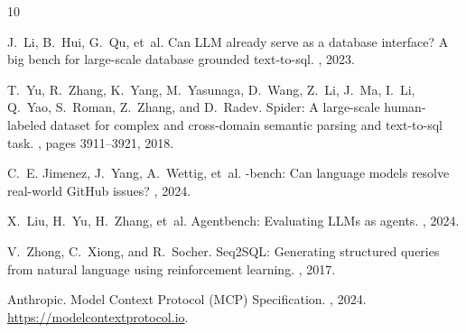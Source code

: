 \documentclass[11pt,a4paper]{article}
\begin{document}

\begin{thebibliography}{10}

J.~Li, B.~Hui, G.~Qu, et~al.
\newblock Can {LLM} already serve as a database interface? {A} big bench for large-scale database grounded text-to-sql.
, 2023.

T.~Yu, R.~Zhang, K.~Yang, M.~Yasunaga, D.~Wang, Z.~Li, J.~Ma, I.~Li, Q.~Yao, S.~Roman, Z.~Zhang, and D.~Radev.
\newblock Spider: A large-scale human-labeled dataset for complex and cross-domain semantic parsing and text-to-sql task.
, pages 3911--3921, 2018.


C.~E. Jimenez, J.~Yang, A.~Wettig, et~al.
-bench: Can language models resolve real-world {GitHub} issues?
, 2024.

X.~Liu, H.~Yu, H.~Zhang, et~al.
\newblock Agentbench: Evaluating {LLMs} as agents.
, 2024.

V.~Zhong, C.~Xiong, and R.~Socher.
\newblock Seq2{SQL}: Generating structured queries from natural language using reinforcement learning.
, 2017.

Anthropic.
\newblock Model Context Protocol (MCP) Specification.
, 2024.
\newblock \url{https://modelcontextprotocol.io}.


\end{thebibliography}
\end{document}
